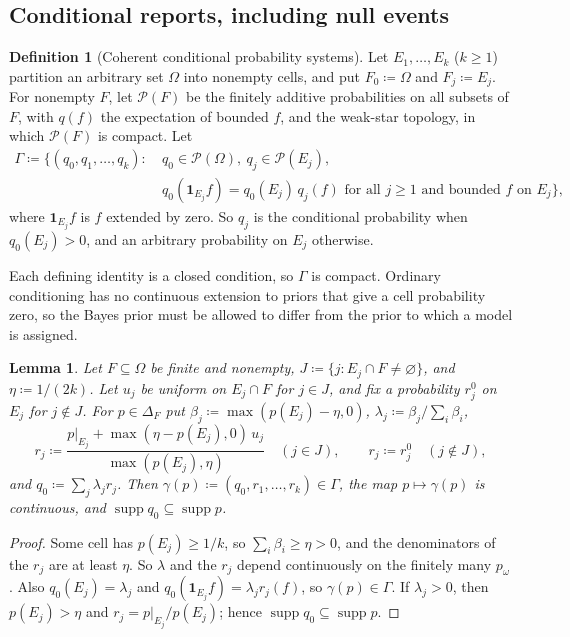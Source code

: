 \documentclass[11pt]{article}
\newtheorem{lemma}[theorem]{Lemma}
\theoremstyle{definition}
\newtheorem{definition}[theorem]{Definition}
\theoremstyle{remark}
\newcommand{\PP}{\mathcal P}
\newcommand{\one}{\mathbf 1}
\newcommand{\supp}{\operatorname{supp}}
\begin{document}
\subsection{Conditional reports, including null events}\label{sec:conditional}
\begin{definition}[Coherent conditional probability systems]\label{def:conditional-systems}
Let $E_1,\dots,E_k$ ($k\ge1$) partition an arbitrary set $\Omega$ into nonempty cells, and put $F_0\coloneqq\Omega$ and $F_j\coloneqq E_j$. For nonempty $F$, let $\PP(F)$ be the finitely additive probabilities on all subsets of $F$, with $q(f)$ the expectation of bounded $f$, and the weak-star topology, in which $\PP(F)$ is compact. Let
\[
\begin{aligned}
\Gamma\coloneqq\bigl\{(q_0,q_1,\dots,q_k):\ & q_0\in\PP(\Omega),\ q_j\in\PP(E_j),\\
& q_0(\one_{E_j}f)=q_0(E_j)\,q_j(f)\text{ for all }j\ge1\text{ and bounded }f\text{ on }E_j\bigr\},
\end{aligned}
\]
where $\one_{E_j}f$ is $f$ extended by zero. So $q_j$ is the conditional probability when $q_0(E_j)>0$, and an arbitrary probability on $E_j$ otherwise.
\end{definition}

Each defining identity is a closed condition, so $\Gamma$ is compact. Ordinary conditioning has no continuous extension to priors that give a cell probability zero, so the Bayes prior must be allowed to differ from the prior to which a model is assigned.

\begin{lemma}\label{lem:section}
Let $F\subseteq\Omega$ be finite and nonempty, $J\coloneqq\{j:E_j\cap F\ne\varnothing\}$, and $\eta\coloneqq1/(2k)$. Let $u_j$ be uniform on $E_j\cap F$ for $j\in J$, and fix a probability $r_j^0$ on $E_j$ for $j\notin J$. For $p\in\Delta_F$ put $\beta_j\coloneqq\max(p(E_j)-\eta,0)$, $\lambda_j\coloneqq\beta_j/\sum_i\beta_i$,
\[
r_j\coloneqq\frac{p|_{E_j}+\max(\eta-p(E_j),0)\,u_j}{\max(p(E_j),\eta)}\quad(j\in J),\qquad r_j\coloneqq r_j^0\quad(j\notin J),
\]
and $q_0\coloneqq\sum_j\lambda_jr_j$. Then $\gamma(p)\coloneqq(q_0,r_1,\dots,r_k)\in\Gamma$, the map $p\mapsto\gamma(p)$ is continuous, and $\supp q_0\subseteq\supp p$.
\end{lemma}
\begin{proof}
Some cell has $p(E_j)\ge1/k$, so $\sum_i\beta_i\ge\eta>0$, and the denominators of the $r_j$ are at least $\eta$. So $\lambda$ and the $r_j$ depend continuously on the finitely many $p_\omega$. Also $q_0(E_j)=\lambda_j$ and $q_0(\one_{E_j}f)=\lambda_jr_j(f)$, so $\gamma(p)\in\Gamma$. If $\lambda_j>0$, then $p(E_j)>\eta$ and $r_j=p|_{E_j}/p(E_j)$; hence $\supp q_0\subseteq\supp p$.
\end{proof}
\end{document}
